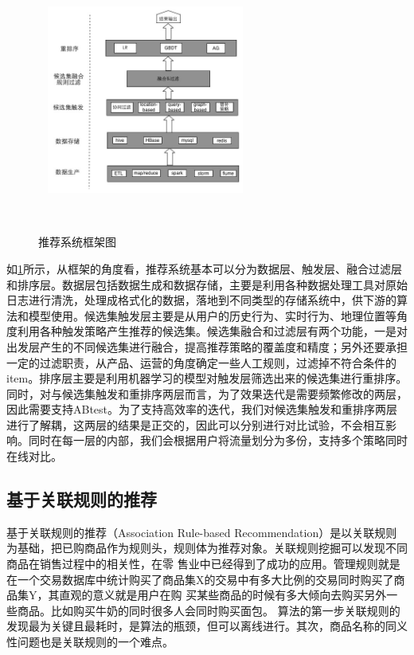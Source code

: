 \begin{figure}[htbp]
\centering 
\includegraphics[width=6.5cm]{pic/system_infrastructure.jpg} 
\caption{推荐系统框架图} \label{fig:system_infrastructure} 
\end{figure}
如\ref{fig:system_infrastructure}所示，从框架的角度看，推荐系统基本可以分为数据层、触发层、融合过滤层和排序层。数据层包括数据生成和数据存储，主要是利用各种数据处理工具对原始日志进行清洗，处理成格式化的数据，落地到不同类型的存储系统中，供下游的算法和模型使用。候选集触发层主要是从用户的历史行为、实时行为、地理位置等角度利用各种触发策略产生推荐的候选集。候选集融合和过滤层有两个功能，一是对出发层产生的不同候选集进行融合，提高推荐策略的覆盖度和精度；另外还要承担一定的过滤职责，从产品、运营的角度确定一些人工规则，过滤掉不符合条件的item。排序层主要是利用机器学习的模型对触发层筛选出来的候选集进行重排序。
同时，对与候选集触发和重排序两层而言，为了效果迭代是需要频繁修改的两层，因此需要支持ABtest。为了支持高效率的迭代，我们对候选集触发和重排序两层进行了解耦，这两层的结果是正交的，因此可以分别进行对比试验，不会相互影响。同时在每一层的内部，我们会根据用户将流量划分为多份，支持多个策略同时在线对比。

  \subsection{基于关联规则的推荐}
  基于关联规则的推荐（Association Rule-based Recommendation）是以关联规则为基础，把已购商品作为规则头，规则体为推荐对象。关联规则挖掘可以发现不同商品在销售过程中的相关性，在零 售业中已经得到了成功的应用。管理规则就是在一个交易数据库中统计购买了商品集X的交易中有多大比例的交易同时购买了商品集Y，其直观的意义就是用户在购 买某些商品的时候有多大倾向去购买另外一些商品。比如购买牛奶的同时很多人会同时购买面包。
  算法的第一步关联规则的发现最为关键且最耗时，是算法的瓶颈，但可以离线进行。其次，商品名称的同义性问题也是关联规则的一个难点。


